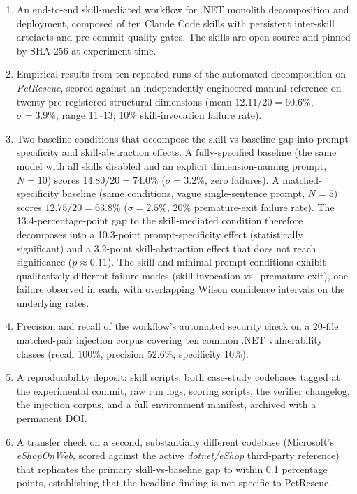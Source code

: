 \documentclass[journal]{IEEEtran}
\begin{document}
\begin{enumerate}
  \item An end-to-end skill-mediated workflow for .NET monolith
        decomposition and deployment, composed of ten Claude Code
        skills with persistent inter-skill artefacts and pre-commit
        quality gates. The skills are open-source and pinned by
        SHA-256 at experiment time.
  \item Empirical results from ten repeated runs of the automated
        decomposition on \textit{PetRescue}, scored against an
        independently-engineered manual reference on twenty
        pre-registered structural dimensions
        (mean $12.11/20 = 60.6\%$, $\sigma{=}3.9\%$,
        range 11--13; 10\% skill-invocation failure rate).
  \item Two baseline conditions that decompose the skill-vs-baseline
        gap into prompt-specificity and skill-abstraction effects.
        A fully-specified baseline (the same model with all skills
        disabled and an explicit dimension-naming prompt, $N{=}10$)
        scores $14.80/20 = 74.0\%$ ($\sigma{=}3.2\%$, zero failures).
        A matched-specificity baseline (same conditions, vague
        single-sentence prompt, $N{=}5$) scores $12.75/20 = 63.8\%$
        ($\sigma{=}2.5\%$, 20\% premature-exit failure rate). The
        13.4-percentage-point gap to the skill-mediated condition
        therefore decomposes into a 10.3-point prompt-specificity
        effect (statistically significant) and a 3.2-point
        skill-abstraction effect that does not reach significance
        ($p \approx 0.11$). The skill and minimal-prompt conditions
        exhibit qualitatively different failure modes
        (skill-invocation vs.\ premature-exit), one failure observed
        in each, with overlapping Wilson confidence intervals on
        the underlying rates.
  \item Precision and recall of the workflow's automated security
        check on a 20-file matched-pair injection corpus covering
        ten common .NET vulnerability classes
        (recall 100\%, precision 52.6\%, specificity 10\%).
  \item A reproducibility deposit: skill scripts, both case-study
        codebases tagged at the experimental commit, raw run logs,
        scoring scripts, the verifier changelog, the injection
        corpus, and a full environment manifest, archived with a
        permanent DOI.
  \item A transfer check on a second, substantially different
        codebase (Microsoft's \textit{eShopOnWeb}, scored against
        the active \textit{dotnet/eShop} third-party reference)
        that replicates the primary skill-vs-baseline gap to within
        0.1 percentage points, establishing that the headline
        finding is not specific to PetRescue.
\end{enumerate}
\end{document}
